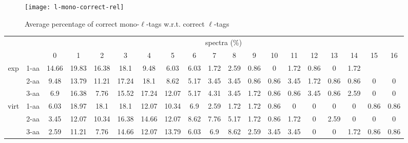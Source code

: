 \documentclass{article}[12pt]
\begin{document}
\begin{figure}
  \begin{center}
\texttt{[image: l-mono-correct-rel]}
\end{center}
\caption{Average percentage of correct mono-$\ell$-tags w.r.t. correct $\ell$-tags}
  \label{fig:l-mono-correct-rel}
\end{figure}


\begin{landscape}
\begin{table}[h]\tiny
\vspace{3mm}
{\centering
\begin{center}
\begin{tabular}{|c|l|c|c|c|c|c|c|c|c|c|c|c|c|c|c|c|c|c|}
  \hline
  \multicolumn{2}{|c|}{ } & \multicolumn{ 17 }{|c|}{ spectra (\%)} \\
  \cline{3- 19}
  \multicolumn{2}{|c|}{ }  & 0 & 1 & 2 & 3 & 4 & 5 & 6 & 7 & 8 & 9 & 10 & 11 & 12 & 13 & 14 & 15 & 16\\
  \hline
  \multirow{3}{*}{exp}
&  1-aa  & 14.66 & 19.83 & 16.38 & 18.1 & 9.48 & 6.03 & 6.03 & 1.72 & 2.59 & 0.86 & 0 & 1.72 & 0.86 & 0 & 1.72 &  & \\
&  2-aa  & 9.48 & 13.79 & 11.21 & 17.24 & 18.1 & 8.62 & 5.17 & 3.45 & 3.45 & 0.86 & 0.86 & 3.45 & 1.72 & 0.86 & 0.86 & 0 & 0\\
&  3-aa  & 6.9 & 16.38 & 7.76 & 15.52 & 17.24 & 12.07 & 5.17 & 4.31 & 3.45 & 1.72 & 0.86 & 0.86 & 3.45 & 0.86 & 2.59 & 0 & 0\\
 \hline
  \multirow{3}{*}{virt} 
&  1-aa  & 6.03 & 18.97 & 18.1 & 18.1 & 12.07 & 10.34 & 6.9 & 2.59 & 1.72 & 1.72 & 0.86 & 0 & 0 & 0 & 0 & 0.86 & 0.86\\
&  2-aa  & 3.45 & 12.07 & 10.34 & 16.38 & 14.66 & 12.07 & 8.62 & 7.76 & 5.17 & 1.72 & 0.86 & 1.72 & 0 & 2.59 & 0 & 0 & 0\\
&  3-aa  & 2.59 & 11.21 & 7.76 & 14.66 & 12.07 & 13.79 & 6.03 & 6.9 & 8.62 & 2.59 & 3.45 & 3.45 & 0 & 0 & 1.72 & 0.86 & 0.86\\
 \hline
\end{tabular}
\end{center}
\par}
\centering
\vspace{3mm}
\end{table}


\end{landscape}
\end{document}
